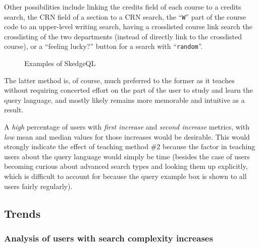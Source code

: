 {\begin{enumerate}
{  Other possibilities include linking the credits field of each course to a credits search, the CRN field of a section to a CRN search, the ``{\tt W}'' part of the course code to an upper-level writing search, having a crosslisted course link search the crosslisting of the two departments (instead of directly link to the crosslisted course), or a ``feeling lucky?'' button for a search with ``{\tt random}''.}
\end{enumerate}

\begin{figure}[H]
  \centering
  \caption{Examples of SkedgeQL} \label{fig:sk-search2}
\end{figure}

\noindent The latter method is, of course, much preferred to the former as it teaches without requiring concerted effort on the part of the user to study and learn the query language, and mostly likely remains more memorable and intuitive as a result.

A \emph{high} percentage of users with \emph{first increase} and \emph{second increase} metrics, with \emph{low} mean and median values for those increases would be desirable. This would strongly indicate the effect of teaching method \#2 because the factor in teaching users about the query language would simply be time (besides the case of users becoming curious about advanced search types and looking them up explicitly, which is difficult to account for because the query example box is shown to all users fairly regularly).

\subsection{Trends}

\subsubsection{Analysis of users with search complexity increases}

}
